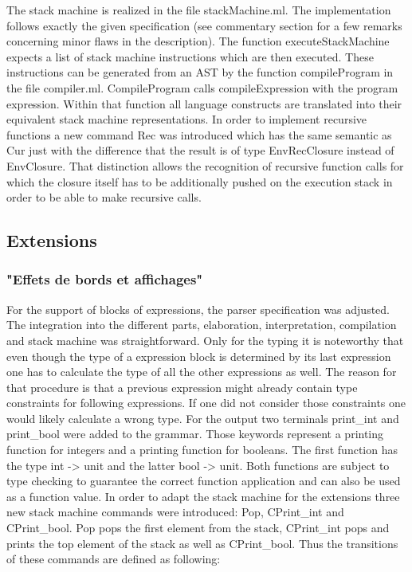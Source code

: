 \documentclass[a4paper, 12pt, titlepage]{article}
\begin{document}
The stack machine is realized in the file stackMachine.ml. The implementation follows exactly the given specification (see commentary section for a few remarks concerning minor flaws in the description). The function executeStackMachine expects a list of stack machine instructions which are then executed. These instructions can be generated from an AST by the function compileProgram in the file compiler.ml. CompileProgram calls compileExpression with the program expression. Within that function all language constructs are translated into their equivalent stack machine representations. In order to implement recursive functions a new command Rec was introduced which has the same semantic as Cur just with the difference that the result is of type EnvRecClosure instead of EnvClosure. That distinction allows the recognition of recursive function calls for which the closure itself has to be additionally pushed on the execution stack in order to be able to make recursive calls.

\subsection{Extensions}

\subsubsection{"Effets de bords et affichages"}

For the support of blocks of expressions, the parser specification was adjusted. The integration into the different parts, elaboration, interpretation, compilation and stack machine was straightforward. Only for the typing it is noteworthy that even though the type of a expression block is determined by its last expression one has to calculate the type of all the other expressions as well. The reason for that procedure is that a previous expression might already contain type constraints for following expressions. If one did not consider those constraints one would likely calculate a wrong type. For the output two terminals print\_int and print\_bool were added to the grammar. Those keywords represent a printing function for integers and a printing function for booleans. The first function has the type int -> unit and the latter bool -> unit. Both functions are subject to type checking to guarantee the correct function application and can also be used as a function value. In order to adapt the stack machine for the extensions three new stack machine commands were introduced: Pop, CPrint\_int and CPrint\_bool. Pop pops the first element from the stack, CPrint\_int pops and prints the top element of the stack as well as CPrint\_bool. Thus the transitions of these commands are defined as following:
\end{document}
